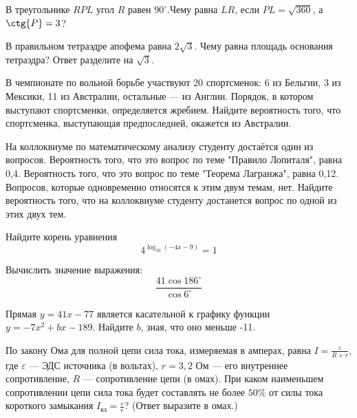 \documentclass[twocolumn]{article}
\begin{document}
\cleardoublepage
\def\examvart{Вариант 19.1}
\normalsize

\startpartone
\large




\begin{taskBN}{1}
В треугольнике $RPL$ угол $R$ равен $90^\circ$.Чему равна  $LR$, если $PL=\sqrt{360}$, а  $\ctg{P}=3$? 
\end{taskBN}

\begin{taskBN}{2}
В правильном тетраэдре апофема равна $2\sqrt{3}$. Чему равна площадь основания тетраэдра? Ответ разделите на $\sqrt{3}$.\vspace{2.5cm}
\end{taskBN}

\begin{taskBN}{3}
В чемпионате по вольной борьбе участвуют 20 спортсменок: 6 из Бельгии, 3 из Мексики, 11 из Австралии, остальные — из Англии. Порядок, в котором выступают спортсменки, определяется жребием. Найдите вероятность того, что спортсменка, выступающая предпоследней, окажется из Австралии.
\end{taskBN}

\begin{taskBN}{4}
На коллоквиуме по математическому анализу студенту достаётся один из вопросов. Вероятность того, что это вопрос по теме "Правило Лопиталя", равна 0,4. Вероятность того, что это вопрос по теме "Теорема Лагранжа", равна 0,12. Вопросов, которые одновременно относятся к этим двум темам, нет. Найдите вероятность того, что на коллоквиуме студенту достанется вопрос по одной из этих двух тем.
\end{taskBN}

\begin{taskBN}{5}
Найдите корень уравнения $$4^{\log_{16}{(-4x-9)}}=1$$
\end{taskBN}

\begin{taskBN}{6}
Вычислить значение выражения: $$ \frac{{41}\cos{186}^\circ}{\cos{6}^\circ}$$
\end{taskBN}

\begin{taskBN}{7}
Прямая $y=41x-77$ является касательной к графику функции $y=-7x^{2}+bx-189$. Найдите $b$, зная, что оно меньше -11.
\end{taskBN}

\begin{taskBN}{8}
По закону Ома для полной цепи сила тока, измеряемая в амперах, равна $I=\frac{\varepsilon}{R+r}$, где $\varepsilon$ — ЭДС источника (в вольтах), $r= 3{,}2 $ Ом — его внутреннее сопротивление, $R$ — сопротивление цепи (в омах). При каком наименьшем сопротивлении цепи сила тока будет составлять не более $50\%$ от силы тока короткого замыкания $I_{\mbox{кз}}=\frac{\varepsilon}{r}$? (Ответ выразите в омах.)
\end{taskBN}
\end{document}
